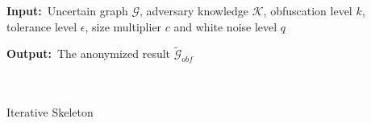 \begin{algorithm}
	\begin{algorithmic}[1]
    	\item[] {\textbf{Input:}~Uncertain graph $\mathcal{G}$, adversary knowledge $\mathcal{K}$, obfuscation level $k$, tolerance level $\epsilon$, size multiplier $c$ and white noise level $q$ }
        \item[] {\textbf{Output:}~The anonymized result $\tilde{\mathcal{G}}_{obf}$}
     	 \\
        \REPEAT
         \\
         \\
        \REPEAT
    	\caption{\SysName Iterative Skeleton}
	 \label{alg:Skeleton}
    \end{algorithmic}
\end{algorithm}
